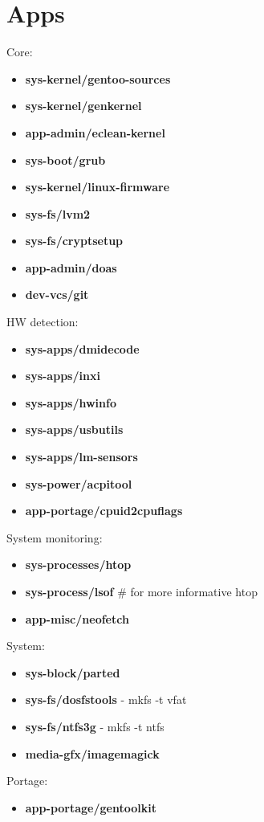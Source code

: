 \documentclass[10pt, a4paper, onecolumn, openany]{book}         %
\begin{document}
\chapter{Apps}
Core:
\begin{itemize}
    \item \textbf{sys-kernel/gentoo-sources}
    \item \textbf{sys-kernel/genkernel}
    \item \textbf{app-admin/eclean-kernel}
    \item \textbf{sys-boot/grub}
    \item \textbf{sys-kernel/linux-firmware}
    \item \textbf{sys-fs/lvm2}
    \item \textbf{sys-fs/cryptsetup}
    \item \textbf{app-admin/doas}
    \item \textbf{dev-vcs/git}
\end{itemize}
HW detection:
\begin{itemize}
    \item \textbf{sys-apps/dmidecode}
    \item \textbf{sys-apps/inxi}
    \item \textbf{sys-apps/hwinfo}
    \item \textbf{sys-apps/usbutils}
    \item \textbf{sys-apps/lm-sensors}
    \item \textbf{sys-power/acpitool}
    \item \textbf{app-portage/cpuid2cpuflags}
\end{itemize}
System monitoring:
\begin{itemize}
    \item \textbf{sys-processes/htop}
    \item \textbf{sys-process/lsof} \# for more informative htop
    \item \textbf{app-misc/neofetch}
\end{itemize}
System:
\begin{itemize}
    \item \textbf{sys-block/parted}
    \item \textbf{sys-fs/dosfstools} - mkfs -t vfat
    \item \textbf{sys-fs/ntfs3g} - mkfs -t ntfs
    \item \textbf{media-gfx/imagemagick}
\end{itemize}
Portage:
\begin{itemize}
    \item \textbf{app-portage/gentoolkit}
\end{itemize}
\end{document}
